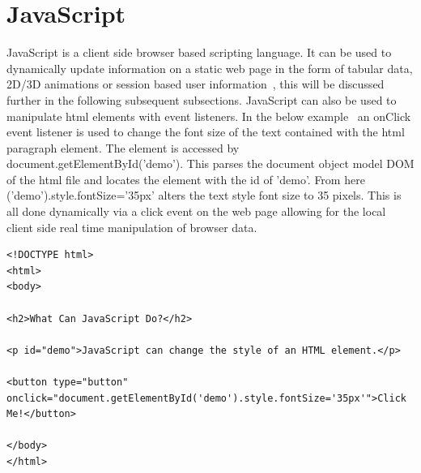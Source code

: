 \section{JavaScript}
JavaScript is a client side browser based scripting language.
It can be used to dynamically update information on a static web page in the form of tabular data, 2D/3D animations or session based user information~\cite{JavaScri52:online}, this will be discussed further in the following subsequent subsections. JavaScript can also be used to manipulate html elements with event listeners. In the below example~\cite{fontSize:online} an onClick event listener is used to change the font size of the text contained with the html paragraph element. The element is accessed by document.getElementById('demo'). This parses the document object model DOM of the html file and locates the element with the id of 'demo'. From here  ('demo').style.fontSize='35px' alters the text style font size to 35 pixels.
This is all done dynamically via a click event on the web page allowing for the local client side real time manipulation of browser data.
\begin{verbatim}
<!DOCTYPE html>
<html>
<body>

<h2>What Can JavaScript Do?</h2>

<p id="demo">JavaScript can change the style of an HTML element.</p>

<button type="button" onclick="document.getElementById('demo').style.fontSize='35px'">Click Me!</button>

</body>
</html> 
\end{verbatim}  
